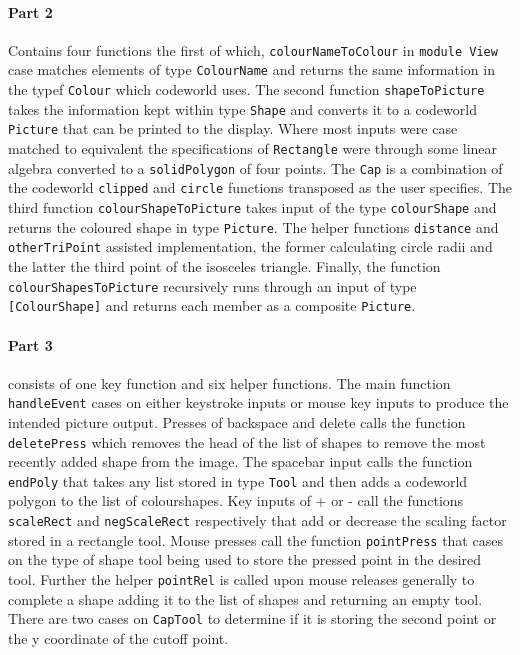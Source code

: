\documentclass[11pt]{article}
\begin{document}
\paragraph{Part 2} Contains four functions the first of which, \verb|colourNameToColour| in \verb|module View|  case matches elements of  type \verb|ColourName| and returns the same information in the typef \verb|Colour| which codeworld uses. The second function \verb|shapeToPicture| takes the information kept within  type \verb|Shape| and converts it to a codeworld \verb|Picture| that can be printed to the display. Where most inputs were case matched to equivalent the specifications of \verb|Rectangle| were through some linear algebra converted to a \verb|solidPolygon| of four points. The \verb|Cap| is a combination of the codeworld \verb|clipped| and \verb|circle| functions transposed as the user specifies. The third function \verb|colourShapeToPicture| takes input of the type \verb|colourShape| and returns the coloured shape in type \verb|Picture|. The helper functions \verb|distance| and \verb|otherTriPoint| assisted implementation, the former calculating circle radii and the latter the third point of the isosceles triangle. Finally, the function \verb|colourShapesToPicture| recursively runs through an input of type \verb|[ColourShape]| and returns each member as a composite \verb|Picture|.

\paragraph{Part 3} consists of one key function and six helper functions. The main function \verb|handleEvent| cases on either keystroke inputs or mouse key inputs to produce the intended picture output. Presses of backspace and delete calls the function \verb|deletePress| which removes the head of the list of shapes to remove the most recently added shape from the image. The spacebar input calls the function \verb|endPoly| that takes any list stored in type \verb|Tool| and then adds a codeworld polygon to the list of colourshapes. Key inputs of + or - call the functions \verb|scaleRect| and \verb|negScaleRect| respectively that add or decrease the scaling factor stored in a rectangle tool. Mouse presses call the function \verb|pointPress| that cases on the type of shape tool being used to store the pressed point in the desired tool. Further the helper \verb|pointRel| is called upon mouse releases generally to complete a shape adding it to the list of shapes and returning an empty tool. There are two cases on \verb|CapTool| to determine if it is storing the second point or the y coordinate of the cutoff point.
\end{document}
